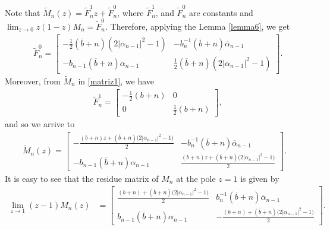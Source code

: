 \documentclass[12pt]{amsart}
\newtheorem{corollary}{Corollary}[section]
\begin{document}
Note that \( \widetilde{M}_n(z)=\widetilde{F}_n^{1}z+\widetilde{F}_n^{0} \), where \( \widetilde{F}_n^{1} \), and \( \widetilde{F}_n^{0} \) are constants and \( \displaystyle \lim_{z \to 0}z(1-z)M_n=\widetilde{F}_n^{0} \).
 Therefore, applying the Lemma \ref{lemma6}, we get
\begin{align*}
& \widetilde{F}_n^{0}={\begin{bmatrix}
-\frac{1}{2}(\overline{b}+n) ( 2|\alpha_{n-1}|^2-1 ) & -b_n^{-1}(\overline{b}+n)\overline{\alpha}_{n-1} \\
 -b_{n-1}(\overline{b}+n)\alpha_{n-1} & \frac{1}{2}(\overline{b}+n) ( 2|\alpha_{n-1}|^2-1) 
\end{bmatrix}} .
\end{align*}
Moreover, from \( \widetilde{M}_n \) in \eqref{matriz1}, we have
\begin{align*}
& \widetilde{F}_n^{1}={\begin{bmatrix}
-\frac{1}{2}(b+n) & 0 \\
 0 & \frac{1}{2}(b+n)
\end{bmatrix}},
\end{align*}
and so we arrive to
{\small
\begin{align}\label{matrizhat}
\widetilde{M}_n(z)
 =
\begin{bmatrix}
\displaystyle
-\frac{(b+n)z+(\overline{b}+n)\big(2|\alpha_{n-1}|^2-1\big)}{2} & -b_{n}^{-1}(\overline{b}+n)\overline{\alpha}_{n-1} \\
-b_{n-1} (\overline{b}+n)\alpha_{n-1} &
\displaystyle
\frac{(b+n)z+(\overline{b}+n)\big(2|\alpha_{n-1}|^2-1\big)}{2}
\end{bmatrix}.
\end{align}
}
{\hspace{-.075cm}}It is easy to see that the residue matrix of \( M_n \) at the pole \( z=1 \) is given by
{\small
\begin{align*}
 \lim_{z \to 1}(z-1)M_n(z)
 & =
\begin{bmatrix}
\displaystyle
\frac{(b+n)+(\overline{b}+n)\big(2|\alpha_{n-1}|^2-1\big)}{2} & b_{n}^{-1}(\overline{b}+n)\overline{\alpha}_{n-1} \\
b_{n-1} (\overline{b}+n)\alpha_{n-1} &
\displaystyle
-\frac{(b+n)+(\overline{b}+n)\big(2|\alpha_{n-1}|^2-1\big)}{2}
\end{bmatrix}.
\end{align*}}
\end{document}
